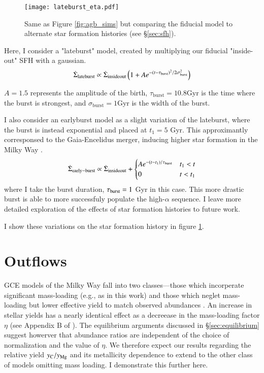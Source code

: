 \documentclass[12pt,oneside]{report}
\begin{document}
\begin{figure}
\centering
\texttt{[image: lateburst\_eta.pdf]}

\caption[Lateburst models]{Same as Figure \ref{fig:agb_sims} but comparing the fiducial model to alternate star formation histories (see \S \ref{sec:sfh}).}
\label{fig:sfh_models}

\end{figure}


Here, I consider a "lateburst" model, created by multiplying our fiducial "inside-out" SFH with a gaussian.
\begin{equation}\label{eq:lateburst}
    \dot{\Sigma}_{\rm lateburst} \propto \dot{\Sigma}_{\rm insideout} \left(1 + A e^{-(t-\tau_{\rm burst})^2/2\sigma^2_{\rm burst}} \right)
\end{equation}

$A=1.5$ represents the amplitude of the birth, $\tau_\text{burst}=10.8$Gyr is the time where the burst is strongest, and $\sigma_\text{burst}=1$Gyr is the width of the burst.

I also consider an earlyburst model as a slight variation of the lateburst, where the burst is instead exponential and placed at $t_1=5$ Gyr. This approximantly corresponsed to the Gaia-Encelidus merger, inducing higher star formation in the Milky Way \citep{bonaca20, helmi18}.
\begin{equation}\label{eq:twoinfall}
    \dot{\Sigma}_{\rm early-burst} \propto \dot{\Sigma}_{\rm insideout} + 
\begin{cases}
    Ae^{-(t-t_1)/\tau_{\rm burst}} & t_1 < t \\
      0 & t<t_1
\end{cases}
\end{equation}
where I take the burst duration, $\tau_{\rm burst}=1$ Gyr in this case. 
This more drastic burst is able to more successfuly populate the high-$\alpha$ sequence. I leave more detailed exploration of the effects of star formation histories to future work.

I show these variations on the star formation history in figure \ref{fig:sfh_models}.


\section{Outflows} \label{sec:outflows}

GCE models of the Milky Way fall into two classes---those which incorperate significant mass-loading (e.g., as in this work) and those which neglet mass-loading but lower effective yield to match observed abundances \citep{MCM13, MCM14, spitoni19, spitoni20, spitoni21}.
An increase in stellar yields has a nearly identical effect as a decreease in the mass-loading factor $\eta$ (see Appendix B of \cite{james_dwarf}).
The equilibrium arguments discussed in \S\ref{sec:equilibrium} suggest howerver that abundance ratios are independent of the choice of normalization and the value of $\eta$. We therefore expect our results regarding the relative yield $y_{\rm C}/y_{\rm Mg}$ and its metallicity dependence to extend to the other class of models omitting mass loading. I demonstrate this further here.
\end{document}
